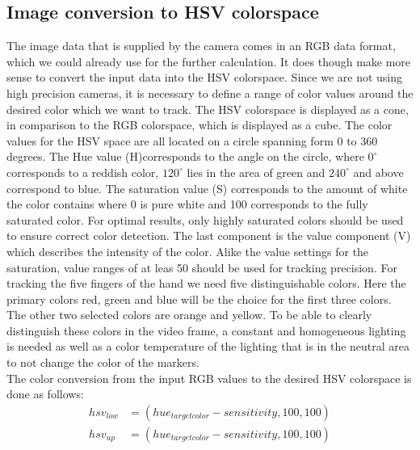 \subsection{Image conversion to HSV colorspace}
The image data that is supplied by the camera comes in an RGB data format, which we could already use for the further calculation. It does though make more sense to convert the input data into the HSV colorspace. Since we are not using high precision cameras, it is necessary to define a range of color values around the desired color which we want to track. The HSV colorspace is displayed as a cone, in comparison to the RGB colorspace, which is displayed as a cube. The color values for the HSV space are all located on a circle spanning form 0 to 360 degrees. The Hue value (H)corresponds to the angle on the circle, where $0^\circ$ corresponds to a reddish color, $120^\circ$ lies in the area of green and $240^\circ$ and above correspond to blue. The saturation value (S) corresponds to the amount of white the color contains  where 0 is pure white and 100 corresponds to the fully saturated color. For optimal results, only highly saturated colors should be used to ensure correct color detection. The last component is the value component (V) which describes the intensity of the color. Alike the value settings for the saturation, value ranges of at leas 50 should be used for tracking precision.
For tracking the five fingers of the hand we need five distinguishable colors. Here the primary colors red, green and blue will be the choice for the first three colors. The other two selected colors are orange and yellow. To be able to clearly distinguish these colors in the video frame, a constant and homogeneous lighting is needed as well as a color temperature of the lighting that is in the neutral area to not change the color of the markers.
\\The color conversion from the input RGB values to the desired HSV colorspace is done as follows:
\begin{equation}
\begin{split}
hsv_{low}&=(hue_{targetcolor}-sensitivity,100,100)\\
hsv_{up}&=(hue_{targetcolor}-sensitivity,100,100)\\
\end{split}
\end{equation}
